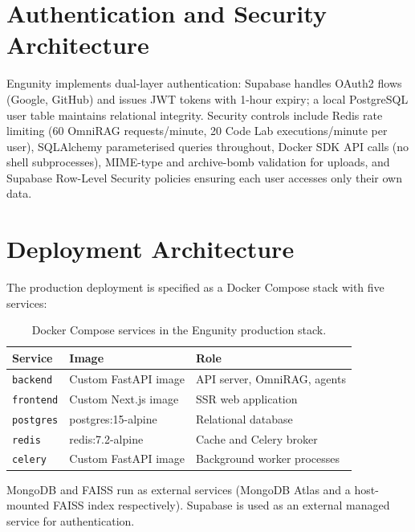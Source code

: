\section{Authentication and Security Architecture}
\label{sec:auth}

Engunity implements dual-layer authentication: Supabase handles OAuth2 flows (Google, GitHub) and issues JWT tokens with 1-hour expiry; a local PostgreSQL user table maintains relational integrity. Security controls include Redis rate limiting (60 OmniRAG requests/minute, 20 Code Lab executions/minute per user), SQLAlchemy parameterised queries throughout, Docker SDK API calls (no shell subprocesses), MIME-type and archive-bomb validation for uploads, and Supabase Row-Level Security policies ensuring each user accesses only their own data.

\section{Deployment Architecture}
\label{sec:deployment}

The production deployment is specified as a Docker Compose stack with five services:

\begin{table}[ht]
    \centering
    \caption{Docker Compose services in the Engunity production stack.}
    \label{tab:docker-services}
    \renewcommand{\arraystretch}{1.3}
    \begin{tabular}{lll}
        \toprule
        \textbf{Service} & \textbf{Image} & \textbf{Role} \\
        \midrule
        \texttt{backend}  & Custom FastAPI image & API server, OmniRAG, agents \\
        \texttt{frontend} & Custom Next.js image & SSR web application \\
        \texttt{postgres} & postgres:15-alpine   & Relational database \\
        \texttt{redis}    & redis:7.2-alpine     & Cache and Celery broker \\
        \texttt{celery}   & Custom FastAPI image & Background worker processes \\
        \bottomrule
    \end{tabular}
\end{table}

MongoDB and FAISS run as external services (MongoDB Atlas and a host-mounted FAISS index respectively). Supabase is used as an external managed service for authentication.

